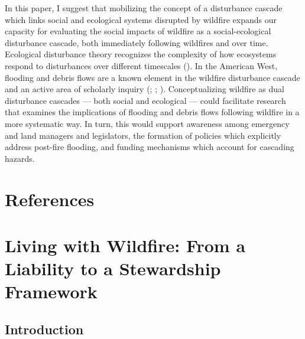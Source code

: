 \documentclass[
]{article}
\begin{document}
In this paper, I suggest that mobilizing the concept of a disturbance cascade which links social and ecological systems disrupted by wildfire expands our capacity for evaluating the social impacts of wildfire as a social-ecological disturbance cascade, both immediately following wildfires and over time. Ecological disturbance theory recognizes the complexity of how ecosystems respond to disturbances over different timescales (). In the American West, flooding and debris flows are a known element in the wildfire disturbance cascade and an active area of scholarly inquiry (; ; ). Conceptualizing wildfire as dual disturbance cascades --- both social and ecological --- could facilitate research that examines the implications of flooding and debris flows following wildfire in a more systematic way. In turn, this would support awareness among emergency and land managers and legislators, the formation of policies which explicitly address post-fire flooding, and funding mechanisms which account for cascading hazards.

\section{References}\label{references-1}

\clearpage

\section{Living with Wildfire: From a Liability to a Stewardship Framework}\label{living-with-wildfire-from-a-liability-to-a-stewardship-framework}

\renewcommand{\thefigure}{3.\arabic{figure}}
\setcounter{figure}{0}
\renewcommand{\thetable}{3.\arabic{table}}
\setcounter{table}{0}
\renewcommand{\theequation}{3.\arabic{equation}}
\setcounter{equation}{0}

\subsection{Introduction}\label{introduction-2}
\end{document}

